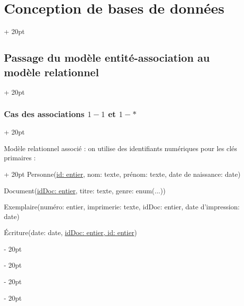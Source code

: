 \documentclass[a4paper, 12pt, twoside]{article}
\newcommand{\ind}[1][20pt]{\advance\leftskip + #1}
\newcommand{\deind}[1][20pt]{\advance\leftskip - #1}
\newenvironment{indt}[2][20pt]{#2 \par \ind[#1]}{\par \deind} %
\begin{document}
\begin{indt}{\section{Conception de bases de données}}
\begin{indt}{\subsection{Passage du modèle entité-association au modèle relationnel}}
\begin{indt}{\subsubsection{Cas des associations $1-1$ et $1-*$}}
\begin{center}
                \end{center}

                \begin{indt}{Modèle relationnel associé : on utilise des identifiants numériques pour les clés primaires :}
                    Personne(\underline{id: entier}, nom: texte, prénom: texte, date de naissance: date)
                    
                    Document(\underline{idDoc: entier}, titre: texte, genre: enum(...))
                    
                    Exemplaire(numéro: entier, imprimerie: texte, idDoc: entier, date d'impression: date)
                    
                    \'Ecriture(date: date, \underline{idDoc: entier, id: entier})
                \end{indt}
            \end{indt}
        \end{indt}
    \end{indt}

    \vspace{12pt}
    
\end{document}
